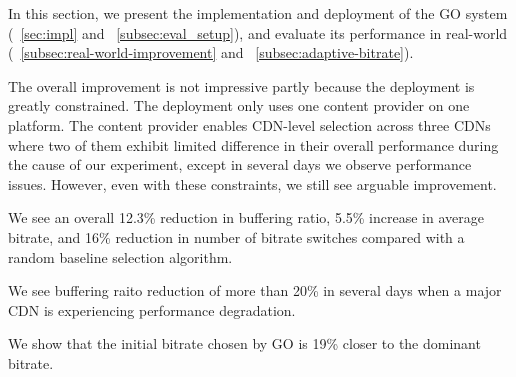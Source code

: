 \label{sec:eval}

In this section, we present the implementation and deployment of the GO system (\Section~\ref{sec:impl} and ~\ref{subsec:eval_setup}), and evaluate its performance in real-world (\Section~\ref{subsec:real-world-improvement} and ~\ref{subsec:adaptive-bitrate}). 

The overall improvement is not impressive partly because the deployment is greatly constrained. The deployment only uses one content provider on one platform. 
The content provider enables CDN-level selection across three CDNs where two of them exhibit limited difference in their overall performance during the cause of our experiment,
except in several days we observe performance issues.
However, even with these constraints, we still see arguable improvement. 

\begin{packedenumerate}
    \item We see an overall 12.3\% reduction in buffering ratio, 5.5\% increase in average bitrate, and 16\% reduction in number of bitrate switches compared with a random baseline selection algorithm.
    \item We see buffering raito reduction of more than 20\% in several days when a major CDN is experiencing performance degradation.
    \item We show that the initial bitrate chosen by GO is 19\% closer to the dominant bitrate.
\end{packedenumerate}




